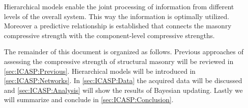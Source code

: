 Hierarchical models enable the joint processing of information from different levels of the overall system.
This way the information is optimally utilized.
Moreover a predictive relationship is established that connects the masonry compressive strength with the component-level compressive strengths.
\par %
The remainder of this document is organized as follows.
Previous approaches of assessing the compressive strength of structural masonry will be reviewed in \cref{sec:ICASP:Previous}.
Hierarchical models will be introduced in \cref{sec:ICASP:Networks}.
In \cref{sec:ICASP:Data} the acquired data will be discussed and \cref{sec:ICASP:Analysis} will show the results of Bayesian updating.
Lastly we will summarize and conclude in \cref{sec:ICASP:Conclusion}.